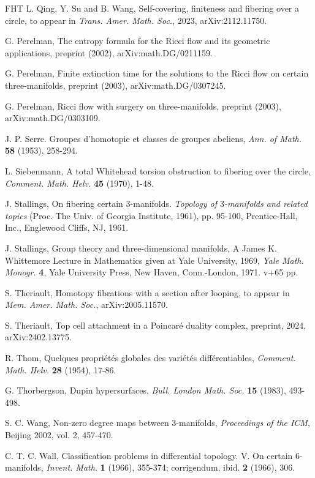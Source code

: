 \documentclass[a4]{amsart}
\theoremstyle{definition}
\begin{document}
\begin{sloppypar}
\begin{thebibliography}{FHT}
 L. Qing, Y. Su and B. Wang, Self-covering, finiteness and fibering over a circle, to appear in \emph{Trans. Amer. Math. Soc.}, 2023, arXiv:2112.11750. 

 G. Perelman, The entropy formula for the Ricci flow and its geometric applications,
preprint (2002), arXiv:math.DG/0211159. 

 G. Perelman, Finite extinction time for the solutions to the Ricci flow on certain
three-manifolds, preprint (2003), arXiv:math.DG/0307245. 

 G. Perelman, Ricci flow with surgery on three-manifolds, preprint (2003), arXiv:math.DG/0303109.
      
 J. P. Serre. Groupes d'homotopie et classes de groupes abeliens, \emph{Ann. of Math.} \textbf{58} (1953), 258-294.

 L. Siebenmann, A total Whitehead torsion obstruction to fibering over the circle, \emph{Comment. Math. Helv.} \textbf{45} (1970), 1-48.

 J. Stallings, On fibering certain $3$-manifolds. \emph{Topology of $3$-manifolds and related topics} (Proc. The Univ. of Georgia Institute, 1961), pp. 95-100, Prentice-Hall, Inc., Englewood Cliffs, NJ, 1961. 

 J. Stallings, Group theory and three-dimensional manifolds, A James K. Whittemore Lecture in Mathematics given at Yale University, 1969, \emph{Yale Math. Monogr.} \textbf{4}, Yale University Press, New Haven, Conn.-London, 1971. v+65 pp.

 S. Theriault, Homotopy fibrations with a section after looping, to appear in 
\emph{Mem. Amer. Math. Soc.}, arXiv:2005.11570. 

 S. Theriault, Top cell attachment in a Poincar\'{e} duality complex, preprint, 2024, arXiv:2402.13775. 


 R. Thom, Quelques propri\'{e}t\'{e}s globales des vari\'{e}t\'{e}s diff\'{e}rentiables, \emph{Comment. Math. Helv.} \textbf{28} (1954), 17-86.

 G. Thorbergson, Dupin hypersurfaces, \emph{Bull. London Math. Soc.} \textbf{15} (1983), 493-498.


 S. C. Wang, Non-zero degree maps between 3-manifolds, \emph{Proceedings of the ICM}, Beijing 2002, vol. 2, 457-470.


 C. T. C. Wall, Classification problems in differential topology. V. On certain 6-manifolds, 
\emph{Invent. Math.} \textbf{1} (1966), 355-374; corrigendum, ibid. \textbf{2} (1966), 306. 



\end{thebibliography}

\end{sloppypar}
\end{document}

